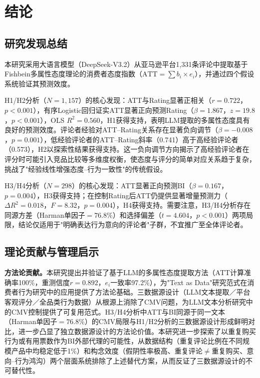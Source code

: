 \section{结论}

\subsection{研究发现总结}

本研究采用大语言模型（DeepSeek-V3.2）从亚马逊平台1{,}331条评论中提取基于Fishbein多属性态度理论的消费者态度指数（$\text{ATT} = \sum b_i \times e_i$），并通过四个假设系统验证其预测效度。

H1/H2分析（$N=1{,}157$）的核心发现：ATT与Rating显著正相关（$r=0.722$，$p<0.001$），有序Logistic回归证实ATT显著正向预测Rating（$\beta=1.867$，$z=19.8$，$p<0.001$），OLS $R^2=0.560$，H1获得支持，表明LLM提取的多属性态度具有良好的预测效度。评论者经验对ATT--Rating关系存在显著负向调节（$\beta=-0.008$，$p=0.001$），低经验评论者的ATT--Rating斜率（0.741）高于高经验评论者（0.573），H2以探索性结果获得支持。这一负向调节方向揭示了高经验评论者在评分时可能引入竞品比较等多维度权衡，使态度与评分的简单对应关系趋于复杂，挑战了"经验线性增强态度--行为一致性"的传统假设。

H3/H4分析（$N=298$）的核心发现：ATT显著正向预测BI（$\beta=0.167$，$p=0.004$），H3获得支持；在控制Rating后ATT仍提供显著增量预测力（$\Delta R^2=0.018$，$F=8.32$，$p=0.004$），H4获得支持。需要注意，H3/H4分析存在同源方差（Harman单因子$=76.8\%$）和选择偏差（$t=4.604$，$p<0.001$）两项局限，结论仅适用于"明确表达行为意向的评论者"子群，不宜推广至全体评论者。

\subsection{理论贡献与管理启示}

\textbf{方法论贡献。}本研究提出并验证了基于LLM的多属性态度提取方法（ATT计算准确率100\%，重测信度$r=0.892$，$e_i$一致率97.2\%），为"Text as Data"研究范式\cite{grimmer2022}在消费者行为研究中的应用提供了方法论基础。三数据源设计（LLM文本提取／平台客观评分／全品类行为数据）从根源上消除了CMV问题\cite{podsakoff2003}，为LLM文本分析研究中的CMV控制提供了可复用范式。H3/H4分析中ATT与BI同源于同一文本（Harman单因子$=76.8\%$）的CMV局限与H1/H2分析的三数据源设计形成鲜明对比，进一步凸显了独立数据源设计的方法论价值。本研究进一步探索了以重复购买行为或有用票数作为BI外部代理的可能性，从数据结构（重复评论比例在不同规模产品中均稳定低于1\%）和构念效度（假阴性率极高、重复评论$\neq$重复购买、意向--行为鸿沟）两个层面系统排除了上述替代方案，从而反证了三数据源设计的不可替代性。

